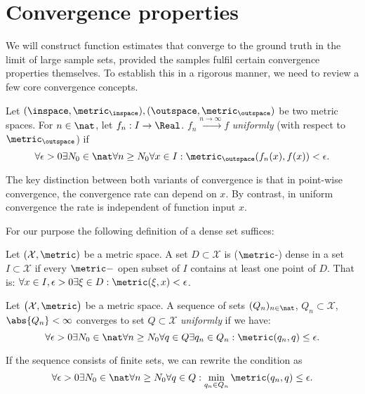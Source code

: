 \section{Convergence properties }
We will construct function estimates that converge to the ground truth in the limit of large sample sets, provided the samples fulfil certain convergence properties themselves. To establish this in a rigorous manner, we need to review a few core convergence concepts. 
\begin{defn} Let $(\inspace, \metric_\inspace), (\outspace,\metric_\outspace)$ be two metric spaces.
For $n \in \nat$, let $f_n : I \to \Real$. $f_n \stackrel{n \to \infty}{\longrightarrow} f$ \emph{uniformly} (with respect to $\metric_\outspace$) if
\[  \forall \epsilon >0  \exists N_0 \in \nat \forall n\geq N_0 \forall x \in I: \metric_\outspace(f_n(x), f(x)) < \epsilon. \] 
\end{defn}

The key distinction between both variants of convergence is that in point-wise convergence, the convergence rate can depend on $x$. By contrast, in uniform convergence the rate is independent of function input $x$.


For our purpose the following definition of a dense set suffices:
\begin{defn}[Dense] Let $(\mathcal X,\metric)$ be a metric space.  
A set $D \subset \mathcal X$ is ($\metric$-) dense in a set $I \subset \mathcal X$ if every  $\metric-$ open subset of $I$ contains at least one point of $D$. That is:
$\forall x \in I, \epsilon > 0 \exists \xi \in D: \metric(\xi,x) < \epsilon$.     
\end{defn}


\begin{defn}\label{def:uniform_setconvergence}
Let $\bigl(\mathcal X,\metric\bigr)$ be a metric space.  
A sequence of sets $(Q_n)_{n \in \nat}$, $Q_n \subset \mathcal X$, $\abs{Q_n} < \infty$ converges to set $Q \subset \mathcal X$ \textit{uniformly} if we have:
\[\forall \epsilon > 0 \exists N_0 \in \nat \forall n \geq N_0 \forall q \in Q \exists q_n \in Q_n : \metric(q_n,q) \leq \epsilon. \]

If the sequence consists of finite sets, we can rewrite the condition as 
\[\forall \epsilon > 0 \exists N_0 \in \nat \forall n \geq N_0 \forall q \in Q : \min_{q_n \in Q_n} \metric(q_n,q) \leq \epsilon. \]

\end{defn}

